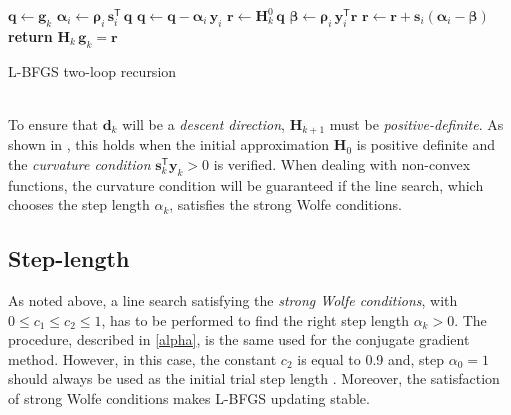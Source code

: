 \begin{algorithm}[H]
\label{alg:bfgs_loop}
\SetAlgoLined
 $\mathbf{q} \leftarrow \mathbf{g}_k$ \;
    {$\boldsymbol\alpha_i \leftarrow \boldsymbol\rho_i \, \mathbf{s}_i^\mathsf{T} \, \mathbf{q}$\;
    $\mathbf{q} \leftarrow \mathbf{q} - \boldsymbol\alpha_i \, \mathbf{y}_i$\;} 
 \EndFor
 $\mathbf{r} \leftarrow \mathbf{H}_k^0 \, \mathbf{q}$\;
    {$\boldsymbol\beta \leftarrow \boldsymbol\rho_i \, \mathbf{y}_i^\mathsf{T} \mathbf{r} $\;
    $\mathbf{r} \leftarrow \mathbf{r} + \mathbf{s}_i(\boldsymbol\alpha_i - \boldsymbol\beta)$\;} 
 \EndFor
 \textbf{return} $\mathbf{H}_k \, \mathbf{g}_k = \mathbf{r}$
 \caption{L-BFGS two-loop recursion}
\end{algorithm}
\\
To ensure that $\mathbf{d}_k$ will be a \emph{descent direction}, $\mathbf{H}_{k+1}$ must be \emph{positive-definite}. As shown in \cite{Nocedal}, this holds when the initial approximation $\mathbf{H}_{0}$ is positive definite and the \emph{curvature condition} $\mathbf{s}_k^\mathsf{T}\mathbf{y}_k > 0$ is verified. When dealing with non-convex functions, the curvature condition will be guaranteed if the line search, which chooses the step length $\alpha_k$, satisfies the strong Wolfe conditions.\\

\subsection{Step-length}\label{alpha_qn}
As noted above, a line search satisfying the \emph{strong Wolfe conditions}, with $0 \leq c_1 \leq c_2 \leq 1$, has to be performed to find the right step length $\alpha_k > 0$. The procedure, described in \ref{alpha}, is the same used for the conjugate gradient method. However, in this case, the constant $c_2$ is equal to 0.9 and, step $\alpha_0 = 1$ should always be used as the initial trial step length . Moreover, the satisfaction of strong Wolfe conditions makes L-BFGS updating stable.

